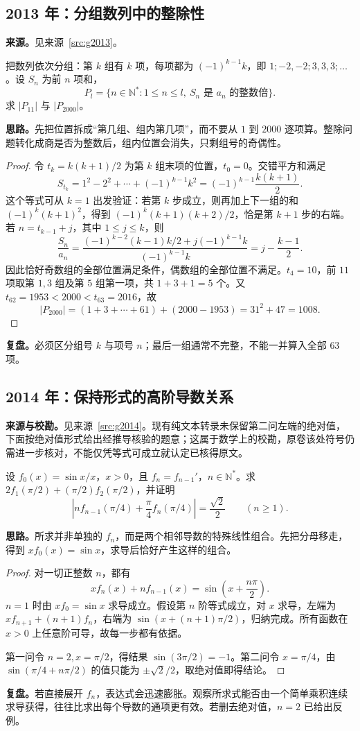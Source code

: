 \documentclass[UTF8]{ctexart}
\begin{document}
\subsection{2013 年：分组数列中的整除性}\label{sec:g2013}
\textbf{来源。}见来源~\ref{src:g2013}。
\begin{example}[题意重述]
把数列依次分组：第 $k$ 组有 $k$ 项，每项都为 $(-1)^{k-1}k$，即 $1;-2,-2;3,3,3;\ldots$。设 $S_n$ 为前 $n$ 项和，
\[
P_l=\{n\in\mathbb N^*:1\leq n\leq l,\ S_n\text{ 是 }a_n\text{ 的整数倍}\}.
\]
求 $|P_{11}|$ 与 $|P_{2000}|$。
\end{example}
\textbf{思路。}先把位置拆成“第几组、组内第几项”，而不要从 $1$ 到 $2000$ 逐项算。整除问题转化成商是否为整数后，组内位置会消失，只剩组号的奇偶性。
\begin{proof}
令 $t_k=k(k+1)/2$ 为第 $k$ 组末项的位置，$t_0=0$。交错平方和满足
\[
S_{t_k}=1^2-2^2+\cdots+(-1)^{k-1}k^2
=(-1)^{k-1}\frac{k(k+1)}2.
\]
这个等式可从 $k=1$ 出发验证：若第 $k$ 步成立，则再加上下一组的和 $(-1)^k(k+1)^2$，得到 $(-1)^k(k+1)(k+2)/2$，恰是第 $k+1$ 步的右端。若 $n=t_{k-1}+j$，其中 $1\leq j\leq k$，则
\[
\frac{S_n}{a_n}
=\frac{(-1)^{k-2}(k-1)k/2+j(-1)^{k-1}k}{(-1)^{k-1}k}
=j-\frac{k-1}{2}.
\]
因此恰好奇数组的全部位置满足条件，偶数组的全部位置不满足。$t_4=10$，前 $11$ 项取第 $1,3$ 组及第 $5$ 组第一项，共 $1+3+1=5$ 个。又 $t_{62}=1953<2000<t_{63}=2016$，故
\[
|P_{2000}|=(1+3+\cdots+61)+(2000-1953)=31^2+47=1008.
\]
\end{proof}
\textbf{复盘。}必须区分组号 $k$ 与项号 $n$；最后一组通常不完整，不能一并算入全部 $63$ 项。

\subsection{2014 年：保持形式的高阶导数关系}\label{sec:g2014}
\textbf{来源与校勘。}见来源~\ref{src:g2014}。现有纯文本转录未保留第二问左端的绝对值，下面按绝对值形式给出经推导核验的题意；这属于数学上的校勘，原卷该处符号仍需进一步核对，不能仅凭等式可成立就认定已核得原文。
\begin{example}[题意重述]
设 $f_0(x)=\sin x/x$，$x>0$，且 $f_n=f_{n-1}'$，$n\in\mathbb N^*$。求 $2f_1(\pi/2)+(\pi/2)f_2(\pi/2)$，并证明
\[
\left|n f_{n-1}(\pi/4)+\frac\pi4f_n(\pi/4)\right|=\frac{\sqrt2}{2}\qquad(n\geq1).
\]
\end{example}
\textbf{思路。}所求并非单独的 $f_n$，而是两个相邻导数的特殊线性组合。先把分母移走，得到 $xf_0(x)=\sin x$，求导后恰好产生这样的组合。
\begin{proof}
对一切正整数 $n$，都有
\begin{equation}\label{eq:g2014}
xf_n(x)+nf_{n-1}(x)=\sin\left(x+\frac{n\pi}{2}\right).
\end{equation}
$n=1$ 时由 $xf_0=\sin x$ 求导成立。假设第 $n$ 阶等式成立，对 $x$ 求导，左端为 $xf_{n+1}+(n+1)f_n$，右端为 $\sin(x+(n+1)\pi/2)$，归纳完成。所有函数在 $x>0$ 上任意阶可导，故每一步都有依据。

第一问令 $n=2,x=\pi/2$，得结果 $\sin(3\pi/2)=-1$。第二问令 $x=\pi/4$，由 $\sin(\pi/4+n\pi/2)$ 的值只能为 $\pm\sqrt2/2$，取绝对值即得结论。
\end{proof}
\textbf{复盘。}若直接展开 $f_n$，表达式会迅速膨胀。观察所求式能否由一个简单乘积连续求导获得，往往比求出每个导数的通项更有效。若删去绝对值，$n=2$ 已给出反例。
\end{document}
